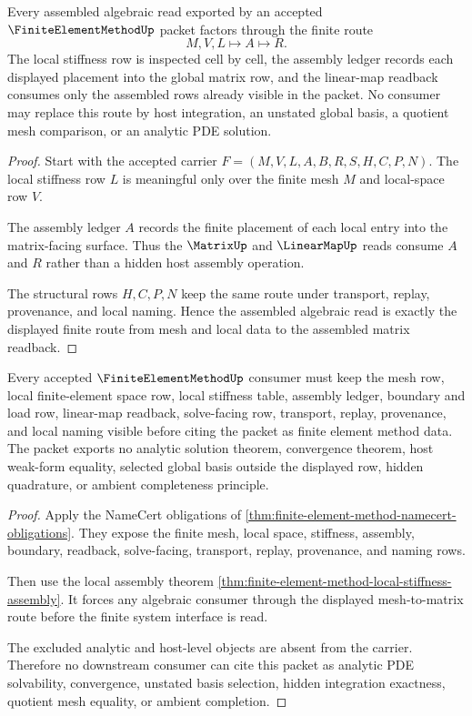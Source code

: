 \begin{theorem}
\label{thm:finite-element-method-local-stiffness-assembly}
Every assembled algebraic read exported by an accepted $\FiniteElementMethodUp$ packet factors through the finite route
$$
M,V,L \longmapsto A \longmapsto R.
$$
The local stiffness row is inspected cell by cell, the assembly ledger records each displayed placement into the global matrix row, and the linear-map readback consumes only the assembled rows already visible in the packet. No consumer may replace this route by host integration, an unstated global basis, a quotient mesh comparison, or an analytic PDE solution.
\end{theorem}
\begin{proof}
Start with the accepted carrier $F=(M,V,L,A,B,R,S,H,C,P,N)$. The local stiffness row $L$ is meaningful only over the finite mesh $M$ and local-space row $V$.

The assembly ledger $A$ records the finite placement of each local entry into the matrix-facing surface. Thus the $\MatrixUp$ and $\LinearMapUp$ reads consume $A$ and $R$ rather than a hidden host assembly operation.

The structural rows $H,C,P,N$ keep the same route under transport, replay, provenance, and local naming. Hence the assembled algebraic read is exactly the displayed finite route from mesh and local data to the assembled matrix readback.
\end{proof}

\begin{theorem}
\label{thm:finite-element-method-nonescape}
Every accepted $\FiniteElementMethodUp$ consumer must keep the mesh row, local finite-element space row, local stiffness table, assembly ledger, boundary and load row, linear-map readback, solve-facing row, transport, replay, provenance, and local naming visible before citing the packet as finite element method data. The packet exports no analytic solution theorem, convergence theorem, host weak-form equality, selected global basis outside the displayed row, hidden quadrature, or ambient completeness principle.
\end{theorem}
\begin{proof}
Apply the NameCert obligations of \autoref{thm:finite-element-method-namecert-obligations}. They expose the finite mesh, local space, stiffness, assembly, boundary, readback, solve-facing, transport, replay, provenance, and naming rows.

Then use the local assembly theorem \autoref{thm:finite-element-method-local-stiffness-assembly}. It forces any algebraic consumer through the displayed mesh-to-matrix route before the finite system interface is read.

The excluded analytic and host-level objects are absent from the carrier. Therefore no downstream consumer can cite this packet as analytic PDE solvability, convergence, unstated basis selection, hidden integration exactness, quotient mesh equality, or ambient completion.
\end{proof}

